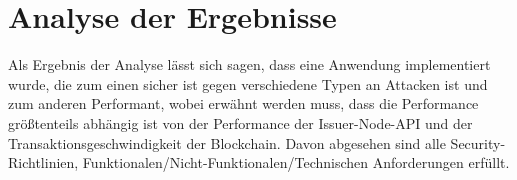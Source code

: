 \section{Analyse der Ergebnisse}
Als Ergebnis der Analyse lässt sich sagen, dass eine Anwendung implementiert wurde, die zum einen sicher ist gegen verschiedene Typen an Attacken ist und zum anderen Performant, wobei erwähnt werden muss, dass die Performance größtenteils abhängig ist von der Performance der Issuer-Node-API und der Transaktionsgeschwindigkeit der Blockchain. Davon abgesehen sind alle Security-Richtlinien, Funktionalen/Nicht-Funktionalen/Technischen Anforderungen erfüllt.


